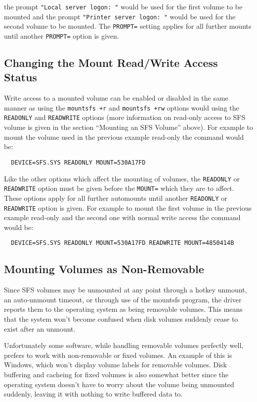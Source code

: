 the prompt {\tt "Local server logon:\ "} would be used for the first volume to be
mounted and the prompt {\tt "Printer server logon:\ "} would be used for the second 
volume to be mounted.  The {\tt PROMPT=} setting applies for all further mounts 
until another {\tt PROMPT=} option is given.


\subsection{Changing the Mount Read/Write Access Status}

Write access to a mounted volume can be enabled or disabled in the same manner 
as using the {\tt mountsfs +r} and {\tt mountsfs +rw} options would using the
{\tt READONLY} and {\tt READWRITE} options (more information on read-only access to SFS 
volume is given in the section ``Mounting an SFS Volume'' above).  For example to 
mount the volume used in the previous example read-only the command would be:

{\tt \verb|  |DEVICE=SFS.SYS READONLY MOUNT=530A17FD}

Like the other options which affect the mounting of volumes, the {\tt READONLY} or 
{\tt READWRITE} option must be given before the {\tt MOUNT=} which they are to affect.  
These options apply for all further automounts until another {\tt READONLY} or 
{\tt READWRITE} option is given.  For example to mount the first volume in the 
previous example read-only and the second one with normal write access the 
command would be:

{\tt \verb|  |DEVICE=SFS.SYS READONLY MOUNT=530A17FD READWRITE MOUNT=4850414B}


\subsection{Mounting Volumes as Non-Removable}
 
Since SFS volumes may be unmounted at any point through a hotkey unmount, an
auto-unmount timeout, or through use of the mountsfs program, the driver
reports them to the operating system as being removable volumes.  This means
that the system won't become confused when disk volumes suddenly cease to exist
after an unmount.

Unfortunately some software, while handling removable volumes perfectly well,
prefers to work with non-removable or fixed volumes.  An example of this is
Windows, which won't display volume labels for removable volumes.  Disk
buffering and cacheing for fixed volumes is also somewhat better since the
operating system doesn't have to worry about the volume being unmounted
suddenly, leaving it with nothing to write buffered data to.


